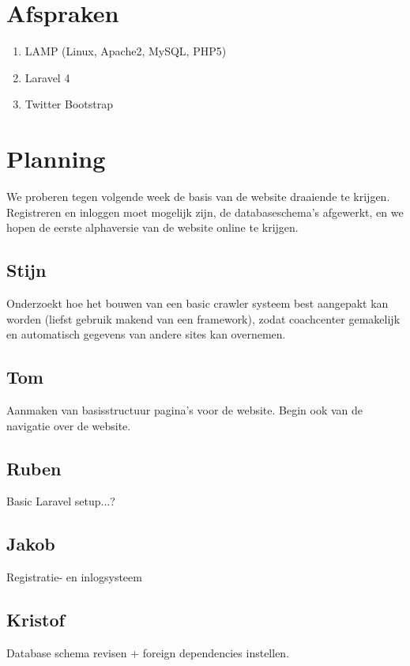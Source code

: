 \documentclass[11pt, a4paper]{article}
\begin{document}
\section{Afspraken}
\begin{enumerate}
\item LAMP (Linux, Apache2, MySQL, PHP5)
\item Laravel 4
\item Twitter Bootstrap
\end{enumerate}


\section{Planning}
We proberen tegen volgende week de basis van de website draaiende te krijgen. Registreren en inloggen moet mogelijk zijn, de databaseschema's afgewerkt, en we hopen de eerste alphaversie van de website online te krijgen.
\subsection{Stijn}
Onderzoekt hoe het bouwen van een basic crawler systeem best aangepakt kan
worden (liefst gebruik makend van een framework), zodat coachcenter gemakelijk
en automatisch gegevens van andere sites kan overnemen.
\subsection{Tom}
Aanmaken van basisstructuur pagina's voor de website. Begin ook van de navigatie over de website.
\subsection{Ruben}
Basic Laravel setup...?
\subsection{Jakob}
Registratie- en inlogsysteem
\subsection{Kristof}
Database schema revisen + foreign dependencies instellen.
\end{document}
